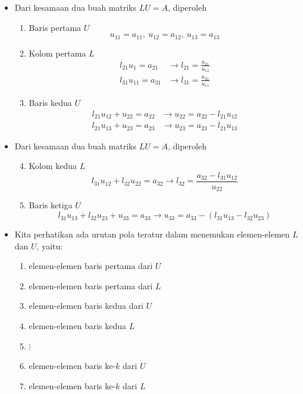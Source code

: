 \documentclass[pdflatex,compress,mathserif]{beamer}
\begin{document}
\begin{frame}
	\begin{itemize}
		\item Dari kesamaan dua buah matriks $ LU = A $, diperoleh
		\begin{enumerate}
			\item Baris pertama $ U $ 
			\[ u_{11} = a_{11},~u_{12} = a_{12},~u_{13}=a_{13}\]
			\item Kolom pertama $ L $
			\begin{align*}
				l_{21} u_1 = a_{21} &\rightarrow l_{21} = \frac{a_{21}}{u_{11}} \\
				l_{31} u_{11} = a_{31} &\rightarrow l_{31} = \frac{a_{31}}{u_{11}}
			\end{align*}
			\item Baris kedua $ U $
			\begin{align*}
				l_{21}u_{12} + u_{22} = a_{22} &\rightarrow u_{22} = a_{22} - l_{21}u_{12} \\
				l_{21}u_{13} + u_{23} = a_{23} &\rightarrow u_{23} = a_{23} - l_{21}u_{13}
			\end{align*}
		\end{enumerate}
	\end{itemize}
\end{frame}

\begin{frame}
	\begin{itemize}
		\item Dari kesamaan dua buah matriks $ LU = A $, diperoleh
		\begin{enumerate}
			\setcounter{enumi}{3}
			\item Kolom kedua $ L $
			\[ l_{31}u_{12} + l_{32}u_{22} = a_{32} \rightarrow l_{32} = \frac{a_{32}-l_{31}u_{12}}{u_{22}} \]
			\item Baris ketiga $ U $
			\[ l_{31}u_{13} + l_{32}u_{23} + u_{33} = a_{33} \rightarrow u_{33} = a_{33} - (l_{31}u_{13} - l_{32}u_{23}) \]
		\end{enumerate}
	\end{itemize}
\end{frame}

\begin{frame}
	\begin{itemize}
		\item Kita perhatikan ada urutan pola teratur dalam menemukan
		elemen-elemen $ L $ dan $ U $, yaitu:
		\begin{enumerate}
			\item elemen-elemen baris pertama dari $ U $
			\item elemen-elemen baris pertama dari $ L $
			\item elemen-elemen baris kedua dari $ U $
			\item elemen-elemen baris kedua $ L $
			\item[] $ \vdots $
			\item elemen-elemen baris ke-$ k $ dari $ U $
			\item elemen-elemen baris ke-$ k $ dari $ L $
		\end{enumerate}
	\end{itemize}
\end{frame}
\end{document}
